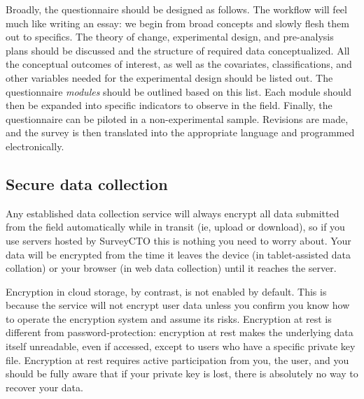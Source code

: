 Broadly, the questionnaire should be designed as follows.
The workflow will feel much like writing an essay:
we begin from broad concepts and slowly flesh them out to specifics.
The theory of change, experimental design, and pre-analysis plans should be discussed
and the structure of required data conceptualized.
All the conceptual outcomes of interest, as well as the covariates, classifications,
and other variables needed for the experimental design should be listed out.
The questionnaire \textit{modules} should be outlined based on this list.
Each module should then be expanded into specific indicators to observe in the field.
Finally, the questionnaire can be piloted in a non-experimental sample.
Revisions are made, and the survey is then translated into the appropriate language and programmed electronically.

\subsection{Secure data collection}

Any established data collection service will always encrypt
all data submitted from the field automatically while in transit
(ie, upload or download), so if you use servers hosted by SurveyCTO
this is nothing you need to worry about.
Your data will be encrypted from the time it leaves the device
(in tablet-assisted data collation) or your browser (in web data collection)
until it reaches the server.


Encryption in cloud storage, by contrast, is not enabled by default.
This is because the service will not encrypt user data unless you confirm
you know how to operate the encryption system and assume its risks.
Encryption at rest is different from password-protection:
encryption at rest makes the underlying data itself unreadable,
even if accessed, except to users who have a specific private key file.
Encryption at rest requires active participation from you, the user,
and you should be fully aware that if your private key is lost,
there is absolutely no way to recover your data.

